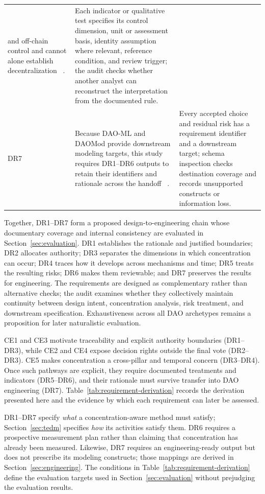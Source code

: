 \documentclass[referee,sn-basic]{sn-jnl}
\begin{document}
\begin{table}[!t]
\begin{tabularx}{\linewidth}{@{}p{.07\linewidth}p{.39\linewidth}X@{}}
and off-chain control and cannot alone establish decentralization
~\citep{Fritsch2024VotingPower,Kitzler2025Governance,
Eisermann2025Concentration}. & Each indicator or
qualitative test specifies its control dimension, unit or assessment basis,
identity assumption where relevant, reference condition, and review trigger;
the audit checks whether another analyst can reconstruct the interpretation
from the documented rule. \\
DR7 & Because DAO-ML and DAOMod provide downstream modeling targets, this study
requires DR1--DR6 outputs to retain their identifiers and rationale across the handoff
~\citep{Avanzo2024DAOML,Avanzo2026DAOMod}.
& Every accepted choice and residual risk has a requirement identifier and a
downstream target; schema inspection checks destination coverage and records
unsupported constructs or information loss. \\
\bottomrule
\end{tabularx}
\end{table}

Together, DR1--DR7 form a proposed design-to-engineering chain whose
documentary coverage and internal consistency are evaluated in
Section~\ref{sec:evaluation}. DR1 establishes the
rationale and justified boundaries; DR2 allocates authority; DR3 separates the
dimensions in which concentration can occur; DR4 traces how it develops across
mechanisms and time; DR5 treats the resulting risks; DR6 makes them reviewable;
and DR7 preserves the results for engineering. The requirements are designed as
complementary rather than alternative checks; the audit examines whether they
collectively maintain continuity between design intent, concentration analysis,
risk treatment, and downstream specification. Exhaustiveness across all DAO
archetypes remains a proposition for later naturalistic evaluation.

CE1 and CE3 motivate traceability and explicit authority boundaries (DR1--DR3),
while CE2 and CE4 expose decision rights outside the final vote (DR2--DR3).
CE5 makes concentration a cross-pillar and temporal concern (DR3--DR4). Once
such pathways are explicit, they require documented treatments and indicators
(DR5--DR6), and their rationale must survive transfer into DAO engineering
(DR7). Table~\ref{tab:requirement-derivation} records the derivation presented here
and the evidence by which each requirement can later be assessed.

DR1--DR7 specify \emph{what} a concentration-aware method must satisfy;
Section~\ref{sec:tedm} specifies \emph{how} its activities satisfy them. DR6
requires a prospective measurement plan rather than claiming that concentration
has already been measured. Likewise, DR7 requires an engineering-ready output
but does not prescribe its modeling constructs; those mappings are derived in
Section~\ref{sec:engineering}. The conditions in
Table~\ref{tab:requirement-derivation} define the evaluation targets used in
Section~\ref{sec:evaluation} without prejudging the evaluation results.
\end{document}
